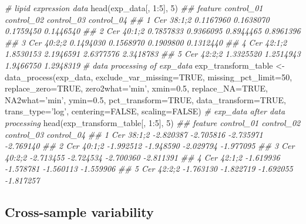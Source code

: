 \documentclass[]{article}
\newcommand{\hlnum}[1]{\textcolor[rgb]{0.816,0.125,0.439}{#1}}%
\newcommand{\hlstr}[1]{\textcolor[rgb]{0.251,0.627,0.251}{#1}}%
\newcommand{\hlcom}[1]{\textcolor[rgb]{0.502,0.502,0.502}{\textit{#1}}}%
\newcommand{\hlopt}[1]{\textcolor[rgb]{0,0,0}{#1}}%
\newcommand{\hlstd}[1]{\textcolor[rgb]{0.251,0.251,0.251}{#1}}%
\newcommand{\hlkwc}[1]{\textcolor[rgb]{0.251,0.251,0.251}{#1}}%
\newcommand{\hlkwd}[1]{\textcolor[rgb]{0.878,0.439,0.125}{#1}}%
\newenvironment{Shaded}{\begin{myshaded}}{\end{myshaded}}
\newcommand{\KeywordTok}[1]{\hlkwd{#1}}
\newcommand{\DataTypeTok}[1]{\hlkwc{#1}}
\newcommand{\DecValTok}[1]{\hlnum{#1}}
\newcommand{\FloatTok}[1]{\hlnum{#1}}
\newcommand{\StringTok}[1]{\hlstr{#1}}
\newcommand{\CommentTok}[1]{\hlcom{#1}}
\newcommand{\OtherTok}[1]{{#1}}
\newcommand{\OperatorTok}[1]{\hlopt{#1}}
\newcommand{\NormalTok}[1]{\hlstd{#1}}
\begin{document}
\begin{Shaded}
\begin{Highlighting}[]
\CommentTok{# lipid expression data }
\KeywordTok{head}\NormalTok{(exp_data[, }\DecValTok{1}\OperatorTok{:}\DecValTok{5}\NormalTok{], }\DecValTok{5}\NormalTok{)}
\CommentTok{##      feature control_01 control_02 control_03 control_04}
\CommentTok{## 1 Cer 38:1;2  0.1167960  0.1638070  0.1759450  0.1446540}
\CommentTok{## 2 Cer 40:1;2  0.7857833  0.9366095  0.8944465  0.8961396}
\CommentTok{## 3 Cer 40:2;2  0.1494030  0.1568970  0.1909800  0.1312440}
\CommentTok{## 4 Cer 42:1;2  1.8530153  2.1946591  2.6377576  2.3418783}
\CommentTok{## 5 Cer 42:2;2  1.3325520  1.2514943  1.9466750  1.2948319}
\CommentTok{# data processing of exp_data}
\NormalTok{exp_transform_table <-}\StringTok{ }\KeywordTok{data_process}\NormalTok{(exp_data, }\DataTypeTok{exclude_var_missing=}\OtherTok{TRUE}\NormalTok{,}
                                    \DataTypeTok{missing_pct_limit=}\DecValTok{50}\NormalTok{, }
                                    \DataTypeTok{replace_zero=}\OtherTok{TRUE}\NormalTok{, }\DataTypeTok{zero2what=}\StringTok{'min'}\NormalTok{, }
                                    \DataTypeTok{xmin=}\FloatTok{0.5}\NormalTok{, }\DataTypeTok{replace_NA=}\OtherTok{TRUE}\NormalTok{,}
                                    \DataTypeTok{NA2what=}\StringTok{'min'}\NormalTok{, }\DataTypeTok{ymin=}\FloatTok{0.5}\NormalTok{, }
                                    \DataTypeTok{pct_transform=}\OtherTok{TRUE}\NormalTok{,}
                                    \DataTypeTok{data_transform=}\OtherTok{TRUE}\NormalTok{, }\DataTypeTok{trans_type=}\StringTok{'log'}\NormalTok{,}
                                    \DataTypeTok{centering=}\OtherTok{FALSE}\NormalTok{, }\DataTypeTok{scaling=}\OtherTok{FALSE}\NormalTok{)}
\CommentTok{# exp_data after data processing}
\KeywordTok{head}\NormalTok{(exp_transform_table[, }\DecValTok{1}\OperatorTok{:}\DecValTok{5}\NormalTok{], }\DecValTok{5}\NormalTok{)}
\CommentTok{##      feature control_01 control_02 control_03 control_04}
\CommentTok{## 1 Cer 38:1;2  -2.820387  -2.705816  -2.735971  -2.769140}
\CommentTok{## 2 Cer 40:1;2  -1.992512  -1.948590  -2.029794  -1.977095}
\CommentTok{## 3 Cer 40:2;2  -2.713455  -2.724534  -2.700360  -2.811391}
\CommentTok{## 4 Cer 42:1;2  -1.619936  -1.578781  -1.560113  -1.559906}
\CommentTok{## 5 Cer 42:2;2  -1.763130  -1.822719  -1.692055  -1.817257}
\end{Highlighting}
\end{Shaded}

\hypertarget{cross-sample-variability}{%
\subsection{Cross-sample variability}\label{cross-sample-variability}}
\end{document}
